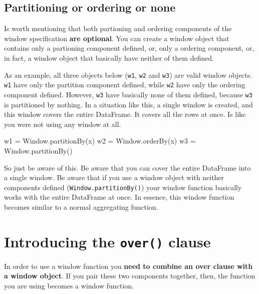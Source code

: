 \documentclass[
  11pt,
  letterpaper,
  DIV=11,
  numbers=noendperiod]{scrreprt}
\newenvironment{Shaded}{\begin{snugshade}}{\end{snugshade}}
\newcommand{\NormalTok}[1]{\textcolor[rgb]{0.00,0.23,0.31}{#1}}
\newcommand{\OperatorTok}[1]{\textcolor[rgb]{0.37,0.37,0.37}{#1}}
\newcommand{\StringTok}[1]{\textcolor[rgb]{0.13,0.47,0.30}{#1}}
\begin{document}
\subsection{Partitioning or ordering or
none}\label{partitioning-or-ordering-or-none}

Is worth mentioning that both partioning and ordering components of the
window specification \textbf{are optional}. You can create a window
object that contains only a partioning component defined, or, only a
ordering component, or, in fact, a window object that basically have
neither of them defined.

As an example, all three objects below (\texttt{w1}, \texttt{w2} and
\texttt{w3}) are valid window objects. \texttt{w1} have only the
partition component defined, while \texttt{w2} have only the ordering
component defined. However, \texttt{w3} have basically none of them
defined, because \texttt{w3} is partitioned by nothing. In a situation
like this, a single window is created, and this window covers the entire
DataFrame. It covers all the rows at once. Is like you were not using
any window at all.

\begin{Shaded}
\begin{Highlighting}[]
\NormalTok{w1 }\OperatorTok{=}\NormalTok{ Window.partitionBy(}\StringTok{\textquotesingle{}x\textquotesingle{}}\NormalTok{)}
\NormalTok{w2 }\OperatorTok{=}\NormalTok{ Window.orderBy(}\StringTok{\textquotesingle{}x\textquotesingle{}}\NormalTok{)}
\NormalTok{w3 }\OperatorTok{=}\NormalTok{ Window.partitionBy()}
\end{Highlighting}
\end{Shaded}

So just be aware of this. Be aware that you can cover the entire
DataFrame into a single window. Be aware that if you use a window object
with neither components defined (\texttt{Window.partitionBy()}) your
window function basically works with the entire DataFrame at once. In
essence, this window function becomes similar to a normal aggregating
function.

\section{\texorpdfstring{Introducing the \texttt{over()}
clause}{Introducing the over() clause}}\label{introducing-the-over-clause}

In order to use a window function you \textbf{need to combine an over
clause with a window object}. If you pair these two components together,
then, the function you are using becomes a window function.
\end{document}
